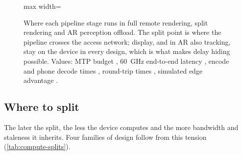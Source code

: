 \begin{figure}[t]
\begin{adjustbox}{max width=\linewidth}
\end{adjustbox}
\caption{Where each pipeline stage runs in full remote rendering, split rendering and AR perception
offload. The split point is where the pipeline crosses the access network; display, and in AR also
tracking, stay on the device in every design, which is what makes delay hiding possible. Values: MTP budget \cite{W2784711283}, 60~GHz end-to-end latency
\cite{W2838572662}, encode and phone decode times \cite{W2940859338}, round-trip times
\cite{W2805833065}, simulated edge advantage \cite{W2894645340}.}
\label{fig:compute-pipeline}
\end{figure}


\subsection{Where to split}

The later the split, the less the device computes and the more bandwidth and staleness it inherits. Four
families of design follow from this tension (\cref{tab:compute-splits}).

